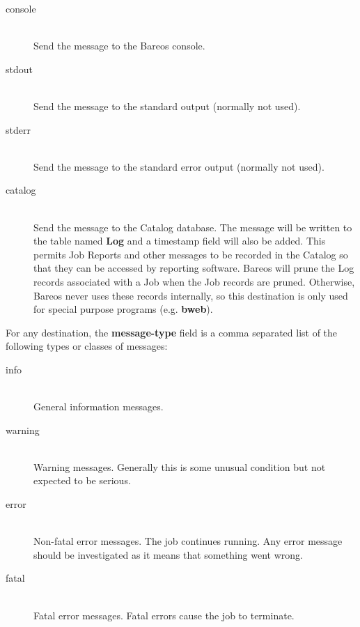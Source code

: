 \begin{description}
\begin{description}
\item [console] \hfill \\
  Send the message to the Bareos console.

\item [stdout] \hfill \\
  Send the message to the standard output (normally not used).

\item [stderr] \hfill \\
  Send the message to the standard error output (normally not used).

\item [catalog] \hfill \\
Send the message to the Catalog database. The message will be
written to the table named {\bf Log} and a timestamp field will
also be added. This permits Job Reports and other messages to
be recorded in the Catalog so that they can be accessed by
reporting software.  Bareos will prune the Log records associated
with a Job when the Job records are pruned.  Otherwise, Bareos
never uses these records internally, so this destination is only
used for special purpose programs (e.g. {\bf bweb}).

\end{description}

For any destination, the {\bf message-type} field is a comma separated
list of the following types or classes of messages:

\begin{description}

\item [info] \hfill \\
General information messages.

\item [warning] \hfill \\
Warning messages. Generally this is some  unusual condition but not expected
to be serious.

\item [error] \hfill \\
Non-fatal error messages. The job continues running.  Any error message should
be investigated as it means that something  went wrong.

\item [fatal] \hfill \\
Fatal error messages. Fatal errors cause the  job to terminate.


\end{description}
\end{description}
